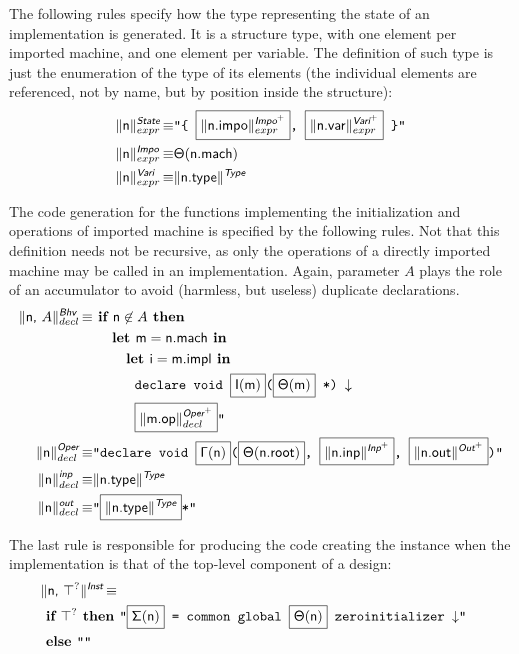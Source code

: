 \documentclass{llncs}
\newcommand{\trad}[2]{\ensuremath{\lVert \textsf{#1} \rVert^{\textit{#2}}}}
\newcommand{\nl}[0]{\ensuremath{\downarrow}}
\DeclareMathOperator{\isdef}{\equiv}
\newcommand{\llvm}[1]{\texttt{#1}}
\newcommand{\B}[1]{\textsf{#1}}
\newcommand{\ListOf}[1]{$\mbox{#1}^+$}
\newcommand{\IF}[0]{\textbf{ if }}
\newcommand{\ELSE}[0]{\textbf{ else }}
\newcommand{\THEN}[0]{\textbf{ then }}
\newcommand{\LET}[0]{\textbf{ let }}
\newcommand{\IN}[0]{\textbf{ in }}
\newcommand{\PH}[1]{\framebox{$#1$}}
\newcommand{\Global}[0]{\ensuremath{\sf\Gamma}}
\newcommand{\state}[0]{\ensuremath{\sf\Theta}}
\newcommand{\self}[0]{\ensuremath{\sf\Sigma}}
\newcommand{\init}[0]{\ensuremath{\mathsf{I}}}
\begin{document}
The following rules specify how the type representing the state of an
implementation is generated. It is a structure type, with one element per
imported machine, and one element per variable. The definition of such type is
just the enumeration of the type of its elements (the individual elements are
referenced, not by name, but by position inside the structure):
\begin{align*}
  \trad{\B{n}}{\B{State}}_{expr} \isdef & \llvm{"\{ \PH{\trad{\B{n.impo}}{\ListOf{\B{Impo}}}_{expr}},  \PH{\trad{\B{n.var}}{\ListOf{\B{Vari}}}_{expr}} \}"} \\
  \trad{\B{n}}{\B{Impo}}_{expr} \isdef & \state(\B{n.mach}) \\
  \trad{\B{n}}{\B{Vari}}_{expr} \isdef & \trad{\B{n.type}}{\B{Type}}
\end{align*}

The code generation for the functions implementing the initialization and
operations of imported machine is specified by the following rules. Not that
this definition needs not be recursive, as only the operations of a directly
imported machine may be called in an implementation. Again, parameter $A$ plays
the role of an accumulator to avoid (harmless, but useless) duplicate
declarations.
\begin{align*}
  \trad{\B{n}, $A$}{\B{Bhv}}_{decl} \isdef 
  & \IF \B{n} \not\in A \THEN \\
  & \quad \LET \B{m} = \B{n.mach} \IN \\
  & \quad \quad \LET \B{i} = \B{m.impl} \IN \\
  & \quad \quad \quad \llvm{declare void \PH{\init(\B{m})}(\PH{\state(\B{m})} *) \nl} \\
  & \quad \quad \quad \llvm{\PH{\trad{\B{m.op}}{\ListOf{\B{Oper}}}_{decl}}"} \\
  \trad{\B{n}}{\B{Oper}}_{decl} \isdef &
  \llvm{"declare void \PH{\Global(\B{n})}(\PH{\state(\B{n.root})}, \PH{\trad{\B{n.inp}}{\ListOf{\B{Inp}}}}, \PH{\trad{\B{n.out}}{\ListOf{\B{Out}}}})"}\\
  \trad{\B{n}}{\B{inp}}_{decl} \isdef & \trad{\B{n.type}}{\B{Type}} \\
  \trad{\B{n}}{\B{out}}_{decl} \isdef & \llvm{"\PH{\trad{\B{n.type}}{\B{Type}}}*"}
\end{align*}

The last rule is responsible for producing the code creating the instance when the
implementation is that of the top-level component of a design:
\begin{align*}
\lefteqn{  \trad{\B{n}, $\top^?$}{\B{Inst}} \isdef } \\
  & \IF \top^? \THEN \llvm{"\PH{\self(\B{n})} = common global \PH{\state(\B{n})} zeroinitializer \nl"} \\
  & \ELSE \llvm{""}
\end{align*}
\end{document}
